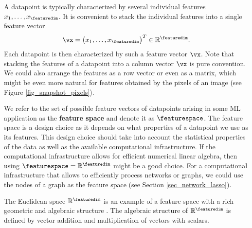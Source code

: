 \documentclass[12pt]{report}
\newcommand{\featurelen}{\featuredim}
\begin{document}
A datapoint is typically characterized by several individual features 
$x_{1},\ldots,x_{\featuredim}$. It is convenient to stack the individual 
features into a single feature vector 
\begin{equation}
\nonumber 
\vx=\big(x_{1},\ldots,x_{\featuredim}\big)^{T} \in \mathbb{R}^{\featuredim}. 
\end{equation}
Each datapoint is then characterized by such a feature vector $\vx$. Note that stacking 
the features of a datapoint into a column vector $\vx$ is pure convention. We could also 
arrange the features as a row vector or even as a matrix, which might be even more natural 
for features obtained by the pixels of an image (see Figure \ref{fig_snapshot_pixels}).

We refer to the set of possible feature vectors of datapoints arising in some ML application 
as the {\bf feature space} and denote it as $\featurespace$. 
The feature space is a design choice as it depends on what properties of a 
datapoint we use as its features. This design choice should take into account 
the statistical properties of the data as well as the available computational infrastructure. 
If the computational infrastructure allows for efficient numerical linear algebra, 
then using $\featurespace = \mathbb{R}^{\featurelen}$ might be a good choice.
For a computational infrastructure that allows to efficiently process networks 
or graphs, we could use the nodes of a graph as the feature space (see Section \ref{sec_network_lasso}). 


 
The Euclidean space $\mathbb{R}^{\featuredim}$ is an example 
of a feature space with a rich geometric and algebraic structure \cite{RudinBookPrinciplesMatheAnalysis}. 
The algebraic structure of $\mathbb{R}^{\featuredim}$ is defined 
by vector addition and multiplication of vectors with scalars. 
\end{document}
